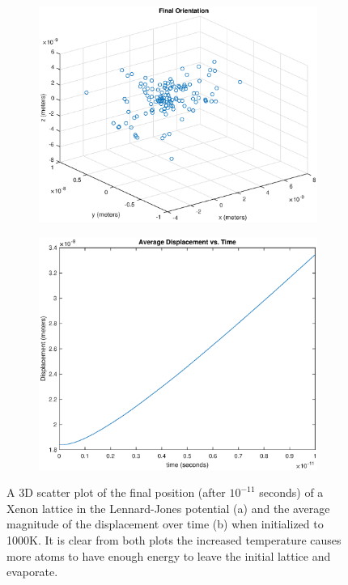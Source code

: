 \documentclass[12pt]{article}
\begin{document}
\begin{figure}[!h]
\begin{subfigure}{0.5\textwidth}
\includegraphics[width=\linewidth]{./finalpics/LJfinal1000.eps}
\caption{\label{LJfinal1000}}
\end{subfigure}
\begin{subfigure}{0.5\textwidth}
\includegraphics[width=\linewidth]{./finalpics/LJaverager1000.eps}
\caption{\label{LJaverage1000}}
\end{subfigure}
\caption{A 3D scatter plot of the final position (after $10^{-11}$ seconds) of a Xenon lattice in the Lennard-Jones potential (a) and the average magnitude of the displacement over time (b)  when initialized to 1000K.  It is clear from both plots the increased temperature causes more atoms to have enough energy to leave the initial lattice and evaporate.} 
\end{figure}
\end{document}
